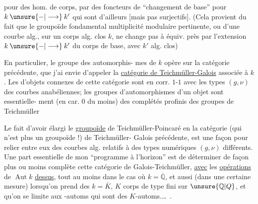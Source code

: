 pour des hom. de corps, par des foncteurs
de ``changement de base'' pour $k\mathbin{\unsure{-|\longrightarrow}}k'$
qui sont d'ailleurs   [mais
pas  surjectifs]. (Cela provient
du fait que le groupoïde fondamental
   multiplicité modulaire pertinente,
ou d'une courbe alg., sur un corps alg.
clos $k$, ne change pas à équiv. près
par l'extension $k\mathbin{\unsure{-|\longrightarrow}}k'$ du corps de base,
avec $k'$ alg. clos) 

En particulier, le groupe des automorphis-
mes de $k$ opère sur la catégorie précédente,
que j'ai envie d'appeler la \uline{catégorie de
Teichmüller-Galois} associée à $k$. Les
  d'objets connexes de cette
catégorie sont en corr. $1$-$1$ avec les types
$(g,\nu)$ des courbes anabéliennes; les groupes
d'automorphismes d'un objet sont essentielle-
ment (en car. $0$ du moins) des complétés
profinis des groupes de Teichmüller 

Le fait d'avoir élargi le \uline{groupoïde} de
Teichmüller-Poincaré en la catégorie (qui n'est
plus un groupoïde !) de Teichmüller-
Galois précédente, est une façon  
pour relier entre eux des courbes alg. relatifs
à des types numériques $(g,\nu)$ différents.
Une part essentielle de mon ``programme
à l'horizon'' est de déterminer de façon
plus ou moins complète cette catégorie
de Galois-Teichmüller,  \uline{avec} les \uline{opérations}
de $\operatorname{Aut}k$ \uline{dessus}, tout au moins dans
le cas où $k=\overline{\mathbb Q}$, et aussi (dans une
certaine mesure) lorsqu'on prend des
$k=\overline K$, $K$ corps de type fini sur $\unsure{\mathbb Q|Q}$, et
qu'on se limite aux -automs  qui
sont des $K$-automs.\ldots\ .

